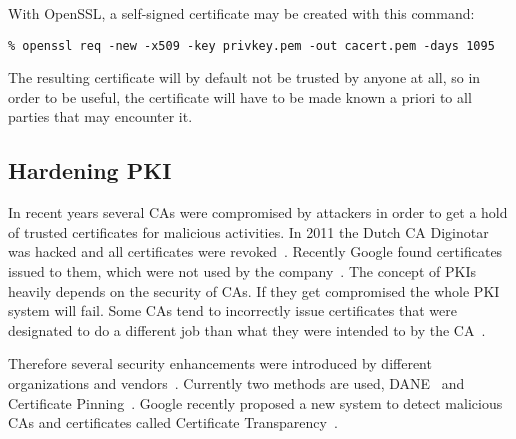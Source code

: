 With OpenSSL, a self-signed certificate may be created with this command:

\begin{lstlisting}
% openssl req -new -x509 -key privkey.pem -out cacert.pem -days 1095
\end{lstlisting}

The resulting certificate will by default not be trusted by anyone at all,
so in order to be useful, the certificate will have to be made known a
priori to all parties that may encounter it.


\subsection{Hardening PKI}
\label{sec:hardeningpki}

In recent years several CAs were compromised by attackers in order to get a
hold of trusted certificates for malicious activities. In 2011 the Dutch CA
Diginotar was hacked and all certificates were revoked~\cite{diginotar-hack}.
Recently Google found certificates issued to them, which were not used by the
company~\cite{googlecahack}. The concept of PKIs heavily depends on the
security of CAs.  If they get compromised the whole PKI system will fail. Some
CAs tend to incorrectly issue certificates that were designated to do a
different job than what they were intended to by the CA~\cite{gocode}.

Therefore several security enhancements were introduced by different
organizations and vendors~\cite{tschofenig-webpki}. Currently two
methods are used, DANE~\cite{rfc6698} and Certificate
Pinning~\cite{draft-ietf-websec-key-pinning}. Google recently proposed
a new system to detect malicious CAs and certificates  called Certificate 
Transparency~\cite{certtransparency}.






